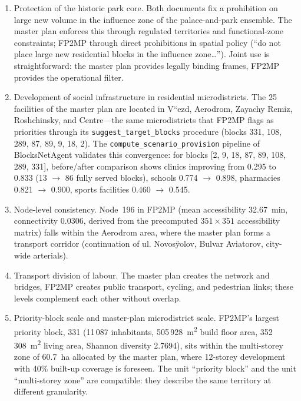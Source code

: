 \begin{enumerate}
  \item Protection of the historic park core. Both documents fix a prohibition on large new volume in the influence zone of the palace-and-park ensemble. The master plan enforces this through regulated territories and functional-zone constraints; FP2MP through direct prohibitions in spatial policy (``do not place large new residential blocks in the influence zone\ldots''). Joint use is straightforward: the master plan provides legally binding frames, FP2MP provides the operational filter.
 
  \item Development of social infrastructure in residential microdistricts. The 25 facilities of the master plan are located in V``ezd, Aerodrom, Zayachy Remiz, Roshchinsky, and Centre---the same microdistricts that FP2MP flags as priorities through its \texttt{suggest\_target\_blocks} procedure (blocks 331, 108, 289, 87, 89, 9, 18, 2). The \texttt{compute\_scenario\_provision} pipeline of BlocksNetAgent validates this convergence: for blocks [2, 9, 18, 87, 89, 108, 289, 331], before/after comparison shows clinics improving from 0.295 to 0.833 (13 $\to$ 86 fully served blocks), schools 0.774 $\to$ 0.898, pharmacies 0.821 $\to$ 0.900, sports facilities 0.460 $\to$ 0.545.
 
  \item Node-level consistency. Node~196 in FP2MP (mean accessibility 32.67~min, connectivity 0.0306, derived from the precomputed $351\times351$ accessibility matrix) falls within the Aerodrom area, where the master plan forms a transport corridor (continuation of ul. Novos\"yolov, Bulvar Aviatorov, city-wide arterials).
 
  \item Transport division of labour. The master plan creates the network and bridges, FP2MP creates public transport, cycling, and pedestrian links; these levels complement each other without overlap.
 
  \item Priority-block scale and master-plan microdistrict scale. FP2MP's largest priority block, 331 (11\,087 inhabitants, 505\,928~m\textsuperscript{2} build floor area, 352\,308~m\textsuperscript{2} living area, Shannon diversity 2.7694), sits within the multi-storey zone of 60.7~ha allocated by the master plan, where 12-storey development with 40\% built-up coverage is foreseen. The unit ``priority block'' and the unit ``multi-storey zone'' are compatible: they describe the same territory at different granularity.
\end{enumerate}
 
